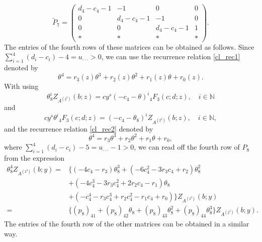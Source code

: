 \documentclass[a4paper,12pt]{article}
\theoremstyle{plain}
\theoremstyle{remark}
\begin{document}
\[
\tilde{P}_7=
\left(
\begin{array}{cccc}
  d_4-c_4-1&-1&0&0\\0&d_4-c_4-1&-1&0\\0&0&d_4-c_4-1&1\\ *&*&*&*
\end{array}
\right).
\]
The entries of the fourth rows of these matrices can be obtained
as follows. Since $\sum_{i=1}^4(d_i-c_i)-4=u_{\cdot\cdot\cdot}>0$,
we can use the recurrence relation \eqref{cl_rec1} denoted by
\[
  \theta^4=r_3(z)\theta^3+r_2(z)\theta^2+r_1(z)\theta+r_0(z).
\]
With using
\[
  \theta_8^iZ_{A^{(2^3)}}(b;z)
  =cy^s(-c_4-\theta)^i{}_4F_3(c;d;z), \quad i\in\mathbb{N}
\]
and
\[
  cy^s\theta^i{}_4F_3(c;d;z)=(-c_4-\theta_8)^iZ_{A^{(2^3)}}(b;z),
  \quad i\in\mathbb{N},
\]
and the recurrence relation \eqref{cl_rec2} denoted by
\[
  \theta^4=r_3\theta^3+r_2\theta^2+r_1\theta+r_0,
\]
where $\sum_{i=1}^4(d_i-c_i)-5=u_{\cdot\cdot\cdot}-1>0$,
we can read off the fourth row of $P_8$ from the expression
\begin{align*}
  \theta_8^4Z_{A^{(2^3)}}(b;y)=
  &\{(-4c_4-r_3)\theta_8^3+(-6c_4^2-3r_3c_4+r_2)\theta_8^2\\
  &+(-4c_4^3-3r_3c_4^2+2r_2c_4-r_1)\theta_8\\
  &+(-c_4^4-r_3c_4^3+r_2c_4^2-r_1c_4+r_0)\}Z_{A^{(2^3)}}(b;y)\\
  =&\{(p_8)_{41}+(p_8)_{42}\theta_8+(p_8)_{43}\theta_8^2
   +(p_8)_{44}\theta_8^3\}Z_{A^{(2^3)}}(b;y).
\end{align*}
The entries of the fourth row of the other matrices can be
obtained in a similar way.
  
\end{document}
